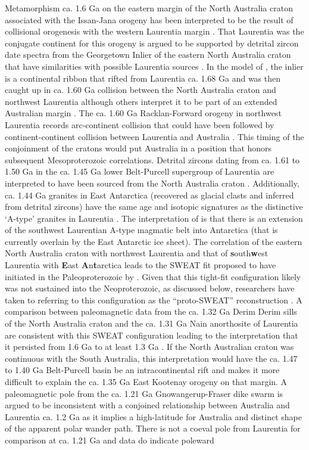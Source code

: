 \documentclass[twocolumn, switch]{article} %
\begin{document}
Metamorphism ca. 1.6 Ga on the eastern margin of the North Australia craton associated with the Issan-Jana orogeny has been interpreted to be the  result of collisional orogenesis with the western Laurentia margin \citep{Nordsvan2018a, Pourteau2018a, Gibson2020a}. That Laurentia was the conjugate continent for this orogeny is argued to be supported by detrital zircon date spectra from the Georgetown Inlier of the eastern North Australia craton that have similarities with possible Laurentia sources \citep{Nordsvan2018a}. In the model of \cite{Nordsvan2018a}, the inlier is a continental ribbon that rifted from Laurentia ca. 1.68 Ga and was then caught up in ca. 1.60 Ga collision between the North Australia craton and northwest Laurentia although others interpret it to be part of an extended Australian margin \citep{Gibson2020a}. The ca. 1.60 Ga Racklan-Forward orogeny in northwest Laurentia records arc-continent collision that could have been followed by continent-continent collision between Laurentia and Australia \citep{Thorkelson2005a, Furlanetto2013a}. This timing of the conjoinment of the cratons would put Australia in a position that honors subsequent Mesoproterozoic correlations. Detrital zircons dating from ca. 1.61 to 1.50 Ga in the ca. 1.45 Ga lower Belt-Purcell supergroup of Laurentia are interpreted to have been sourced from the North Australia craton \citep{Jones2015a}. Additionally, ca. 1.44 Ga granites in East Antarctica (recovered as glacial clasts and inferred from detrital zircons) have the same age and isotopic signatures as the distinctive `A-type' granites in Laurentia \citep{Goodge2008a}. The interpretation of \cite{Goodge2008a, Goodge2017a} is that there is an extension of the southwest Laurentian A-type magmatic belt into Antarctica (that is currently overlain by the East Antarctic ice sheet). The correlation of the eastern North Australia craton with northwest Laurentia and that of \textbf{s}outh\textbf{w}est Laurentia with \textbf{E}ast \textbf{A}n\textbf{t}arctica leads to the SWEAT fit proposed to have initiated in the Paleoproterozoic by \cite{Moores1991a}. Given that this tight-fit configuration likely was not sustained into the Neoproterozoic, as discussed below, researchers have taken to referring to this configuration as  the ``proto-SWEAT'' reconstruction \citep{Payne2009b, Kirscher2020a}. A comparison between paleomagnetic data from the ca. 1.32 Ga Derim Derim sills of the North Australia craton and the ca. 1.31 Ga Nain anorthosite of Laurentia are consistent with this SWEAT configuration leading to the interpretation that it persisted from 1.6 Ga to at least 1.3 Ga \citep{Kirscher2020a}. If the North Australian craton was continuous with the South Australia, this interpretation would have the ca. 1.47 to 1.40 Ga Belt-Purcell basin be an intracontinental rift and makes it more difficult to explain the ca. 1.35 Ga East Kootenay orogeny on that margin. A paleomagnetic pole from the ca. 1.21 Ga Gnowangerup-Fraser dike swarm is argued to be inconsistent with a conjoined relationship between Australia and Laurentia ca. 1.2 Ga as it implies a high-latitude for Australia and distinct shape of the apparent polar wander path\citep{Pisarevsky2014a}. There is not a coeval pole from Laurentia for comparison at ca. 1.21 Ga and data do indicate poleward 
\end{document}
